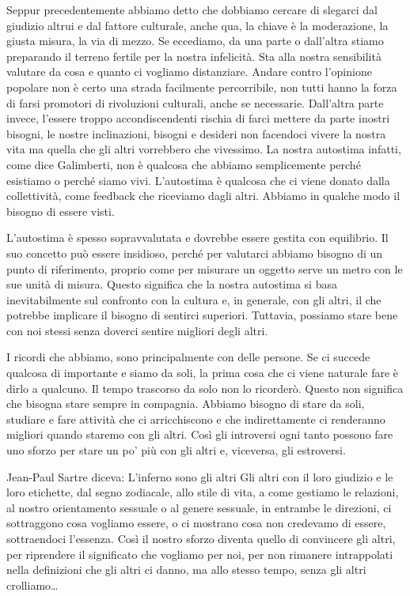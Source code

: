 \documentclass[12pt]{book} %
\begin{document}
Seppur precedentemente abbiamo detto che dobbiamo cercare di slegarci dal giudizio altrui e dal fattore culturale, anche
qua, la chiave è la moderazione, la giusta misura, la via di mezzo. Se eccediamo, da una parte o
dall'altra stiamo preparando il terreno fertile per la nostra infelicità. Sta alla nostra
sensibilità valutare da cosa e quanto ci vogliamo distanziare. Andare contro l'opinione popolare non è
certo una strada facilmente percorribile, non tutti hanno la forza di farsi promotori di rivoluzioni culturali, anche
se necessarie. Dall'altra parte invece, l'essere troppo accondiscendenti
rischia di farci mettere da parte inostri bisogni, le nostre inclinazioni, bisogni e desideri non facendoci
vivere la nostra vita ma quella che gli altri vorrebbero che vivessimo. La nostra autostima infatti, come dice
Galimberti, non è qualcosa che abbiamo semplicemente perché esistiamo o perché siamo vivi.
L'autostima è qualcosa che ci viene donato dalla collettività, come feedback che riceviamo dagli
altri. Abbiamo in qualche modo il bisogno di essere visti.

L'autostima è spesso sopravvalutata e dovrebbe essere gestita con equilibrio. Il suo concetto può essere insidioso, perché per valutarci abbiamo bisogno di un punto di riferimento, proprio come per misurare un oggetto serve un metro con le sue unità di misura. Questo significa che la nostra autostima si basa inevitabilmente sul confronto con la cultura e, in generale, con gli altri, il che potrebbe implicare il bisogno di sentirci superiori.
Tuttavia, possiamo stare bene con noi stessi senza doverci sentire migliori degli altri.

I ricordi che abbiamo, sono principalmente con delle persone. Se ci succede qualcosa di importante e siamo da soli, la prima cosa che ci viene naturale fare è dirlo a qualcuno. Il tempo trascorso da solo non lo ricorderò. Questo non significa che bisogna stare sempre in compagnia. Abbiamo bisogno di stare da soli, studiare e fare attività che ci arricchiscono e che indirettamente ci renderanno migliori quando staremo con gli altri. Così gli introversi ogni tanto possono fare uno sforzo per stare un po' più con gli altri e, viceversa, gli estroversi.

Jean-Paul Sartre diceva: L'inferno sono gli altri
Gli altri con il loro giudizio e le loro etichette, dal segno zodiacale, allo stile di vita, a come gestiamo le relazioni, al nostro orientamento sessuale o al genere sessuale, in entrambe le direzioni, ci sottraggono cosa vogliamo essere, o ci mostrano cosa non credevamo di essere, sottraendoci l'essenza. Così il nostro sforzo diventa quello di convincere gli altri, per riprendere il significato che vogliamo per noi, per non rimanere intrappolati nella definizioni che gli altri ci danno, ma allo stesso tempo, senza gli altri crolliamo…
\end{document}
